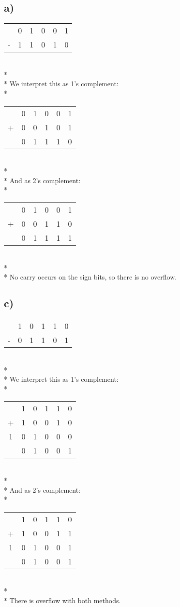 \documentclass{article}
\begin{document}
\subsection{a)}
\begin{tabular}{c@{\,}c@{\,}c@{\,}c@{\,}c@{\,}c}
  &0&1&0&0&1 \\
- &1&1&0&1&0 \\
\hline
\end{tabular}
\\*\\*
We interpret this as 1's complement:
\\*
\begin{tabular}{c@{\,}c@{\,}c@{\,}c@{\,}c@{\,}c}
  &0&1&0&0&1 \\
+ &0&0&1&0&1 \\
\hline
  &0&1&1&1&0 \\
\end{tabular}
\\*\\*
And as 2's complement:
\\*
\begin{tabular}{c@{\,}c@{\,}c@{\,}c@{\,}c@{\,}c}
  &0&1&0&0&1 \\
+ &0&0&1&1&0 \\
\hline
  &0&1&1&1&1 \\
\end{tabular}
\\*\\*
No carry occurs on the sign bits, so there is no overflow.

\subsection{c)}
\begin{tabular}{c@{\,}c@{\,}c@{\,}c@{\,}c@{\,}c}
  &1&0&1&1&0 \\
- &0&1&1&0&1 \\
\hline
\end{tabular}
\\*\\*
We interpret this as 1's complement:
\\*
\begin{tabular}{c@{\,}c@{\,}c@{\,}c@{\,}c@{\,}c}
  &1&0&1&1&0 \\
+ &1&0&0&1&0 \\
\hline
 1&0&1&0&0&0 \\
\hline
  &0&1&0&0&1 \\
\end{tabular}
\\*\\*
And as 2's complement:
\\*
\begin{tabular}{c@{\,}c@{\,}c@{\,}c@{\,}c@{\,}c}
  &1&0&1&1&0 \\
+ &1&0&0&1&1 \\
\hline
 1&0&1&0&0&1 \\
\hline
  &0&1&0&0&1 \\
\end{tabular}
\\*\\*
There is overflow with both methods.
\end{document}
